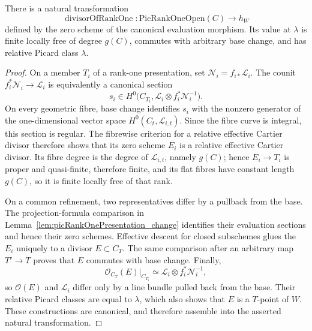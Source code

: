 \begin{definition}
  \label{def:divisorOfRankOne}
  \notready
  There is a natural transformation
  \[
    \operatorname{divisorOfRankOne}\colon
      \mathrm{PicRankOneOpen}(C)\longrightarrow h_W
  \]
  defined by the zero scheme of the canonical evaluation morphism.  Its value at
  \(\lambda\) is finite locally free of degree \(g(C)\), commutes with arbitrary base change,
  and has relative Picard class \(\lambda\).
\end{definition}
\begin{proof}
  On a member \(T_i\) of a rank-one presentation, set
  \(\mathcal N_i=f_{i*}\mathcal L_i\).  The counit
  \(f_i^*\mathcal N_i\to\mathcal L_i\) is equivalently a canonical section
  \[
    s_i\in H^0\bigl(C_{T_i},
      \mathcal L_i\otimes f_i^*\mathcal N_i^{-1}\bigr).
  \]
  On every geometric fibre, base change identifies \(s_i\) with the nonzero generator of the
  one-dimensional vector space \(H^0(C_t,\mathcal L_{i,t})\).  Since the fibre curve is
  integral, this section is regular.  The fibrewise criterion for a relative effective
  Cartier divisor therefore shows that its zero scheme \(E_i\) is a relative effective
  Cartier divisor.  Its fibre degree is the degree of \(\mathcal L_{i,t}\), namely \(g(C)\);
  hence \(E_i\to T_i\) is proper and quasi-finite, therefore finite, and its flat fibres have
  constant length \(g(C)\), so it is finite locally free of that rank.

  On a common refinement, two representatives differ by a pullback from the base.  The
  projection-formula comparison in Lemma~\ref{lem:picRankOnePresentation_change} identifies
  their evaluation sections and hence their zero schemes.  Effective descent for closed
  subschemes glues the \(E_i\) uniquely to a divisor \(E\subset C_T\).  The same comparison
  after an arbitrary map \(T'\to T\) proves that \(E\) commutes with base change.  Finally,
  \[
    \mathcal O_{C_T}(E)|_{C_{T_i}}
      \simeq \mathcal L_i\otimes f_i^*\mathcal N_i^{-1},
  \]
  so \(\mathcal O(E)\) and \(\mathcal L_i\) differ only by a line bundle pulled back from the
  base.  Their relative Picard classes are equal to \(\lambda\), which also shows that \(E\)
  is a \(T\)-point of \(W\).  These constructions are canonical, and therefore assemble into
  the asserted natural transformation.
\end{proof}

